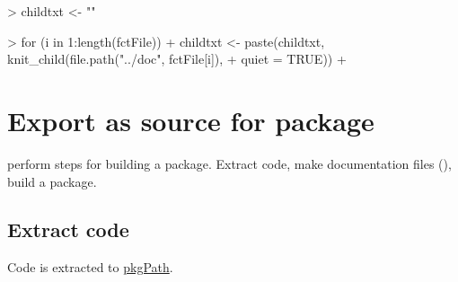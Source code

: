 \documentclass[a4paper,12pt]{article}\usepackage[]{graphicx}\usepackage[]{color}
\begin{document}
\clearpage
\begin{Schunk}
\begin{Sinput}
> childtxt <- ""
\end{Sinput}
\end{Schunk}
\begin{Schunk}
\begin{Sinput}
> for (i in 1:length(fctFile)) {
+     childtxt <- paste(childtxt, knit_child(file.path("../doc", fctFile[i]), 
+         quiet = TRUE))
+ }
\end{Sinput}
\end{Schunk}

\clearpage
\section{Export as source for package}

perform steps for building a package. Extract code, make documentation files (), build a package.

\subsection{Extract code}

Code is extracted to \url{pkgPath}.
\end{document}
